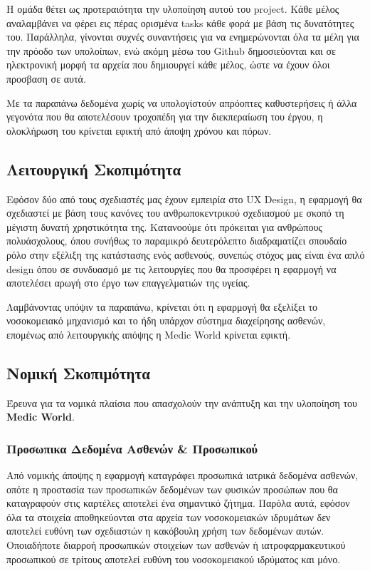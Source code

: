\documentclass{article}
\begin{document}
Η ομάδα θέτει ως προτεραιότητα την υλοποίηση αυτού του project. Κάθε μέλος αναλαμβάνει να φέρει εις πέρας ορισμένα tasks κάθε φορά με βάση τις δυνατότητες του. Παράλληλα, γίνονται συχνές συναντήσεις για να ενημερώνονται όλα τα μέλη για την πρόοδο των υπολοίπων, ενώ ακόμη μέσω του Github δημοσιεύονται και σε ηλεκτρονική μορφή τα αρχεία που δημιουργεί κάθε μέλος, ώστε να έχουν όλοι προσβαση σε αυτά. \newline \par

Με τα παραπάνω δεδομένα χωρίς να υπολογίστούν απρόοπτες καθυστερήσεις ή άλλα γεγονότα που θα αποτελέσουν τροχοπέδη για την διεκπεραίωση του έργου, η ολοκλήρωση του κρίνεται εφικτή από άποψη χρόνου και πόρων.

\subsection{Λειτουργική Σκοπιμότητα}

Εφόσον δύο από τους σχεδιαστές μας έχουν εμπειρία στο UX Design, η εφαρμογή θα σχεδιαστεί με βάση τους κανόνες του ανθρωποκεντρικού σχεδιασμού με σκοπό τη μέγιστη δυνατή χρηστικότητα της. Κατανοούμε ότι πρόκειται για ανθρώπους πολυάσχολους, όπου συνήθως το παραμικρό δευτερόλεπτο διαδραματίζει σπουδαίο ρόλο στην εξέλιξη της κατάστασης ενός ασθενούς, συνεπώς στόχος μας είναι ένα απλό design όπου σε συνδυασμό με τις λειτουργίες που θα προσφέρει η εφαρμογή να αποτελέσει αρωγή στο έργο των επαγγελματιών της υγείας.\newline\par

Λαμβάνοντας υπόψιν τα παραπάνω, κρίνεται ότι η εφαρμογή θα εξελίξει το νοσοκομειακό μηχανισμό και το ήδη υπάρχον σύστημα διαχείρησης ασθενών, επομένως από λειτουργικής απόψης η Medic World κρίνεται εφικτή.

\newpage

\subsection{Νομική Σκοπιμότητα}

Έρευνα για τα νομικά πλαίσια που απασχολούν την ανάπτυξη και την υλοποίηση του \textbf{Medic World}. 

\subsubsection{Προσωπικα Δεδομένα Ασθενών & Προσωπικού}
Από νομικής άποψης η εφαρμογή καταγράφει προσωπικά ιατρικά δεδομένα ασθενών, οπότε η προστασία των προσωπικών δεδομένων των φυσικών προσώπων που θα καταγραφούν στις καρτέλες αποτελεί ένα σημαντικό ζήτημα. Παρόλα αυτά, εφόσον όλα τα στοιχεία αποθηκεύονται στα αρχεία των νοσοκομειακών ιδρυμάτων δεν αποτελεί ευθύνη των σχεδιαστών η κακόβουλη χρήση των δεδομένων αυτών. Οποιαδήποτε διαρροή προσωπικών στοιχείων των ασθενών ή ιατροφαρμακευτικού προσωπικού σε τρίτους αποτελεί ευθύνη του νοσοκομειακού ιδρύματος και μόνο. \newline \par
\end{document}
